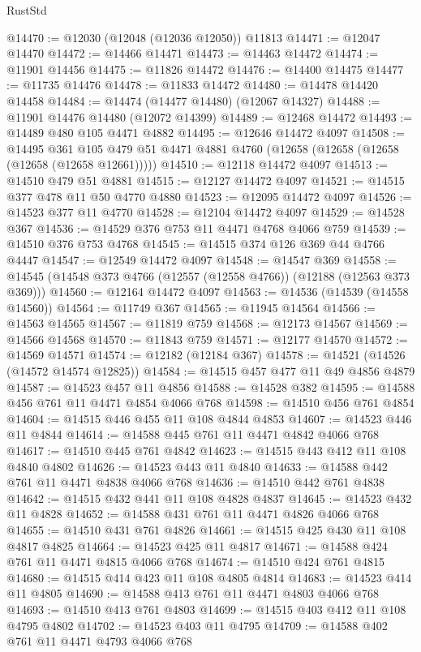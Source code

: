 \begin{lexlean}{RustStd}
\begin{coremodule}
@14470 := @12030 (@12048 (@12036 @12050)) @11813
@14471 := @12047 @14470
@14472 := @14466 @14471
@14473 := @14463 @14472
@14474 := @11901 @14456
@14475 := @11826 @14472
@14476 := @14400 @14475
@14477 := @11735 @14476
@14478 := @11833 @14472
@14480 := @14478 @14420 @14458
@14484 := @14474 (@14477 @14480) (@12067 @14327)
@14488 := @11901 @14476 @14480 (@12072 @14399)
@14489 := @12468 @14472
@14493 := @14489 @480 @105 @4471 @4882
@14495 := @12646 @14472 @4097
@14508 := @14495
    @361
    @105
    @479
    @51
    @4471
    @4881
    @4760
    (@12658 (@12658 (@12658 (@12658 (@12658 @12661)))))
@14510 := @12118 @14472 @4097
@14513 := @14510 @479 @51 @4881
@14515 := @12127 @14472 @4097
@14521 := @14515 @377 @478 @11 @50 @4770 @4880
@14523 := @12095 @14472 @4097
@14526 := @14523 @377 @11 @4770
@14528 := @12104 @14472 @4097
@14529 := @14528 @367
@14536 := @14529 @376 @753 @11 @4471 @4768 @4066 @759
@14539 := @14510 @376 @753 @4768
@14545 := @14515 @374 @126 @369 @44 @4766 @4447
@14547 := @12549 @14472 @4097
@14548 := @14547 @369
@14558 := @14545 (@14548 @373 @4766 (@12557 (@12558 @4766)) (@12188 (@12563 @373 @369)))
@14560 := @12164 @14472 @4097
@14563 := @14536 (@14539 (@14558 @14560))
@14564 := @11749 @367
@14565 := @11945 @14564
@14566 := @14563 @14565
@14567 := @11819 @759
@14568 := @12173 @14567
@14569 := @14566 @14568
@14570 := @11843 @759
@14571 := @12177 @14570
@14572 := @14569 @14571
@14574 := @12182 (@12184 @367)
@14578 := @14521 (@14526 (@14572 @14574 @12825))
@14584 := @14515 @457 @477 @11 @49 @4856 @4879
@14587 := @14523 @457 @11 @4856
@14588 := @14528 @382
@14595 := @14588 @456 @761 @11 @4471 @4854 @4066 @768
@14598 := @14510 @456 @761 @4854
@14604 := @14515 @446 @455 @11 @108 @4844 @4853
@14607 := @14523 @446 @11 @4844
@14614 := @14588 @445 @761 @11 @4471 @4842 @4066 @768
@14617 := @14510 @445 @761 @4842
@14623 := @14515 @443 @412 @11 @108 @4840 @4802
@14626 := @14523 @443 @11 @4840
@14633 := @14588 @442 @761 @11 @4471 @4838 @4066 @768
@14636 := @14510 @442 @761 @4838
@14642 := @14515 @432 @441 @11 @108 @4828 @4837
@14645 := @14523 @432 @11 @4828
@14652 := @14588 @431 @761 @11 @4471 @4826 @4066 @768
@14655 := @14510 @431 @761 @4826
@14661 := @14515 @425 @430 @11 @108 @4817 @4825
@14664 := @14523 @425 @11 @4817
@14671 := @14588 @424 @761 @11 @4471 @4815 @4066 @768
@14674 := @14510 @424 @761 @4815
@14680 := @14515 @414 @423 @11 @108 @4805 @4814
@14683 := @14523 @414 @11 @4805
@14690 := @14588 @413 @761 @11 @4471 @4803 @4066 @768
@14693 := @14510 @413 @761 @4803
@14699 := @14515 @403 @412 @11 @108 @4795 @4802
@14702 := @14523 @403 @11 @4795
@14709 := @14588 @402 @761 @11 @4471 @4793 @4066 @768

\end{coremodule}
\end{lexlean}
